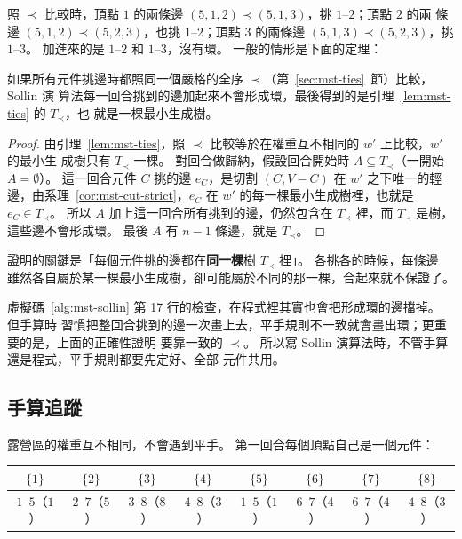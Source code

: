 照 $\prec$ 比較時，頂點 $1$ 的兩條邊 $(5, 1, 2) \prec (5, 1, 3)$，挑 $1$--$2$；頂點 $2$ 的兩
條邊 $(5, 1, 2) \prec (5, 2, 3)$，也挑 $1$--$2$；頂點 $3$ 的兩條邊 $(5, 1, 3) \prec (5, 2,
3)$，挑 $1$--$3$。 加進來的是 $1$--$2$ 和 $1$--$3$，沒有環。 一般的情形是下面的定理：

\begin{theorem}
\label{thm:mst-sollin}
如果所有元件挑邊時都照同一個嚴格的全序 $\prec$（第~\ref{sec:mst-ties}~節）比較，Sollin 演
算法每一回合挑到的邊加起來不會形成環，最後得到的是引理~\ref{lem:mst-ties} 的 $T_{\prec}$，也
就是一棵最小生成樹。
\end{theorem}

\begin{proof}
由引理~\ref{lem:mst-ties}，照 $\prec$ 比較等於在權重互不相同的 $w'$ 上比較，$w'$ 的最小生
成樹只有 $T_{\prec}$ 一棵。 對回合做歸納，假設回合開始時 $A \subseteq T_{\prec}$（一開始
$A = \emptyset$）。 這一回合元件 $C$ 挑的邊 $e_C$，是切割 $(C, V - C)$ 在 $w'$ 之下唯一的輕
邊，由系理~\ref{cor:mst-cut-strict}，$e_C$ 在 $w'$ 的每一棵最小生成樹裡，也就是 $e_C \in
T_{\prec}$。 所以 $A$ 加上這一回合所有挑到的邊，仍然包含在 $T_{\prec}$ 裡，而 $T_{\prec}$
是樹，這些邊不會形成環。 最後 $A$ 有 $n - 1$ 條邊，就是 $T_{\prec}$。
\end{proof}

證明的關鍵是「每個元件挑的邊都在\textbf{同一棵}樹 $T_{\prec}$ 裡」。 各挑各的時候，每條邊
雖然各自屬於某一棵最小生成樹，卻可能屬於不同的那一棵，合起來就不保證了。

虛擬碼~\ref{alg:mst-sollin} 第 17 行的檢查，在程式裡其實也會把形成環的邊擋掉。 但手算時
習慣把整回合挑到的邊一次畫上去，平手規則不一致就會畫出環；更重要的是，上面的正確性證明
要靠一致的 $\prec$。 所以寫 Sollin 演算法時，不管手算還是程式，平手規則都要先定好、全部
元件共用。

\subsection{手算追蹤}

露營區的權重互不相同，不會遇到平手。 第一回合每個頂點自己是一個元件：

\begin{center}
\small
\begin{tabular}{cccccccc}
\toprule
$\{1\}$ & $\{2\}$ & $\{3\}$ & $\{4\}$ & $\{5\}$ & $\{6\}$ & $\{7\}$ & $\{8\}$ \\
\midrule
$1$--$5$（$1$） & $2$--$7$（$5$） & $3$--$8$（$8$） & $4$--$8$（$3$） & $1$--$5$（$1$） &
$6$--$7$（$4$） & $6$--$7$（$4$） & $4$--$8$（$3$） \\
\bottomrule
\end{tabular}
\end{center}

